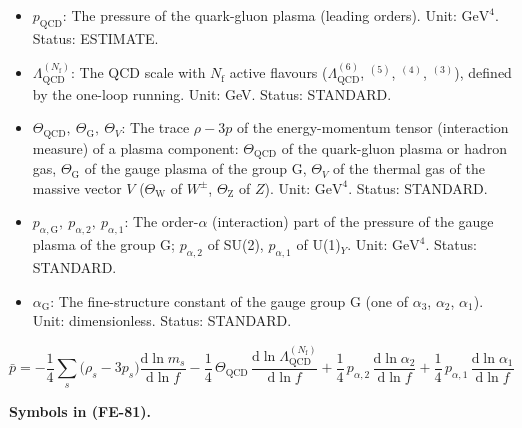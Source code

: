\documentclass[
  10pt,
]{article}
\begin{document}
\begin{itemize}
  \(\rho_i\) of the neutrino mass state \(i\)); in the cosmological
  perturbation equations \(\Delta\rho\) is the density perturbation
  summed over the species. Unit: \(\mathrm{GeV}^{8}\) (eight
  dimensions), \(\mathrm{GeV}^{4}\) (four dimensions). Status: STANDARD.
\item
  \(p_{\mathrm{QCD}}\): The pressure of the quark-gluon plasma (leading
  orders). Unit: \(\mathrm{GeV}^{4}\). Status: ESTIMATE.
\item
  \(\Lambda_{\mathrm{QCD}}^{(N_{\mathrm{f}})}\): The QCD scale with
  \(N_{\mathrm{f}}\) active flavours (\(\Lambda_{\mathrm{QCD}}^{(6)}\),
  \(^{(5)}\), \(^{(4)}\), \(^{(3)}\)), defined by the one-loop running.
  Unit: GeV. Status: STANDARD.
\item
  \(\Theta_{\mathrm{QCD}},\ \Theta_{\mathrm{G}},\ \Theta_V\): The trace
  \(\rho - 3p\) of the energy-momentum tensor (interaction measure) of a
  plasma component: \(\Theta_{\mathrm{QCD}}\) of the quark-gluon plasma
  or hadron gas, \(\Theta_{\mathrm{G}}\) of the gauge plasma of the
  group G, \(\Theta_V\) of the thermal gas of the massive vector \(V\)
  (\(\Theta_{\mathrm{W}}\) of \(W^\pm\), \(\Theta_{\mathrm{Z}}\) of
  \(Z\)). Unit: \(\mathrm{GeV}^{4}\). Status: STANDARD.
\item
  \(p_{\alpha,\mathrm{G}},\ p_{\alpha,2},\ p_{\alpha,1}\): The
  order-\(\alpha\) (interaction) part of the pressure of the gauge
  plasma of the group G; \(p_{\alpha,2}\) of SU(2), \(p_{\alpha,1}\) of
  U(1)\(_Y\). Unit: \(\mathrm{GeV}^{4}\). Status: STANDARD.
\item
  \(\alpha_{\mathrm{G}}\): The fine-structure constant of the gauge
  group G (one of \(\alpha_3\), \(\alpha_2\), \(\alpha_1\)). Unit:
  dimensionless. Status: STANDARD.
\end{itemize}

\[
\bar p = -\frac14\sum_s\big(\rho_s - 3p_s\big)\frac{\mathrm{d}\ln m_s}{\mathrm{d}\ln f}
 - \frac14\,\Theta_{\mathrm{QCD}}\,\frac{\mathrm{d}\ln\Lambda_{\mathrm{QCD}}^{(N_{\mathrm{f}})}}{
 \mathrm{d}\ln f}
 + \frac14\,p_{\alpha,2}\,\frac{\mathrm{d}\ln\alpha_2}{\mathrm{d}\ln f} +
 \frac14\,p_{\alpha,1}\,\frac{\mathrm{d}\ln\alpha_1}{\mathrm{d}\ln f} \tag{FE-81}
\]

\textbf{Symbols in (FE-81).}
\end{document}

